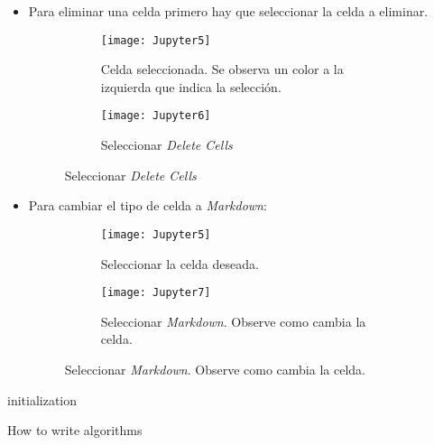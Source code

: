 \documentclass{article}
\begin{document}
\begin{itemize}
                \item Para eliminar una celda primero hay que seleccionar la celda a eliminar.
                \begin{figure}[H]
                    \begin{subfigure}{0.5\textwidth}
                        \texttt{[image: Jupyter5]}
                        \caption{Celda seleccionada. Se observa un color a la izquierda que indica
                        la selecci\'{o}n.}
                    \end{subfigure}
                    \begin{subfigure}{0.5\textwidth}
                        \texttt{[image: Jupyter6]}
                        \caption{Seleccionar \textit{Delete Cells}}
                    \end{subfigure}
                \end{figure}

                \newpage
                \item Para cambiar el tipo de celda a \textit{Markdown}:
                \begin{figure}[H]
                    \begin{subfigure}{0.5\textwidth}
                        \texttt{[image: Jupyter5]}
                        \caption{Seleccionar la celda deseada.}
                    \end{subfigure}
                    \begin{subfigure}{0.5\textwidth}
                        \texttt{[image: Jupyter7]}
                        \caption{Seleccionar \textit{Markdown}. Observe como cambia la celda.}
                    \end{subfigure}
                \end{figure}


            \end{itemize}

            \newpage

            \begin{algorithm}[H]
                \SetAlgoLined
                 initialization\;
                 \caption{How to write algorithms}
            \end{algorithm}
\end{document}
